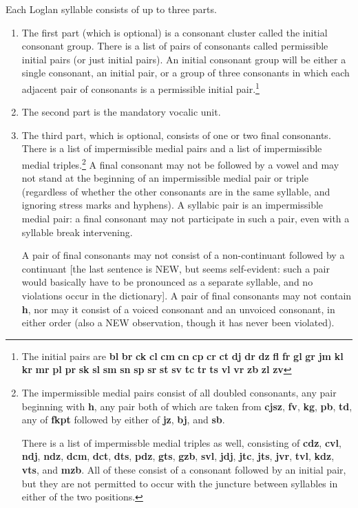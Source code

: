 \documentclass[12pt]{book}
\begin{document}
Each Loglan syllable consists of up to three parts.  
\begin{enumerate}

\item The first part (which is optional) is a consonant cluster called the initial consonant group.  There is a list of pairs of consonants  called permissible initial pairs (or just initial pairs).  An initial consonant group will be either a single consonant, an initial pair, or a group of three consonants in which each adjacent pair of consonants is a permissible initial pair.\footnote{The initial pairs are {\bf bl}  {\bf br}  {\bf ck}  {\bf cl}  {\bf cm}  {\bf cn}   {\bf cp}  {\bf cr}   {\bf ct}   {\bf dj}   {\bf dr}   {\bf dz}  {\bf fl}  {\bf fr}   {\bf gl}   {\bf gr}   {\bf jm}   {\bf kl}  {\bf kr}   {\bf mr}   {\bf pl}  {\bf pr}   {\bf sk}  {\bf sl}   {\bf sm}  {\bf sn}  {\bf sp}   {\bf sr}  {\bf st}  {\bf sv} {\bf tc}  {\bf tr}  {\bf ts}  {\bf vl}  {\bf vr} {\bf  zb}  {\bf  zl}  {\bf zv}}

\item The second part is the mandatory vocalic unit.

\item The third part, which is optional, consists of one or two final consonants.  There is a list of impermissible medial pairs and a list of impermissible medial triples.\footnote{The impermissible medial pairs consist of all doubled consonants, any pair beginning with {\bf h}, any pair both of which are taken from {\bf cjsz}, {\bf fv}, {\bf kg}, {\bf pb}, {\bf td},
any of {\bf fkpt} followed by either of {\bf jz}, {\bf bj}, and {\bf sb}.

There is a list of impermissble medial triples as well, consisting of {\bf cdz}, {\bf cvl}, {\bf ndj}, {\bf ndz}, {\bf dcm}, {\bf dct}, {\bf dts}, {\bf pdz}, {\bf gts}, {\bf gzb}, {\bf svl}, {\bf jdj}, {\bf jtc}, {\bf jts}, {\bf jvr}, {\bf tvl}, {\bf kdz}, {\bf vts}, and {\bf mzb}.  All of these consist of a consonant followed by an initial pair, but they are not permitted to occur with the juncture between syllables in either of the two positions.} A final consonant
may not be followed by a vowel and may not stand at the beginning of an impermissible medial pair or triple (regardless of whether the other consonants are in the same syllable, and ignoring stress marks and hyphens).  A syllabic pair is an impermissible medial pair:  a final consonant may not participate in such a pair, even with a syllable break intervening.

A pair of final consonants may not consist of a non-continuant followed by a continuant [the last sentence is NEW, but seems self-evident:  such a pair would basically have to be pronounced as a separate syllable, and no violations occur in the dictionary].  A pair of final consonants may not contain {\bf h}, nor may it consist of a voiced consonant and an unvoiced consonant, in either order (also a NEW observation, though it has never been violated).


\end{enumerate}
\end{document}
